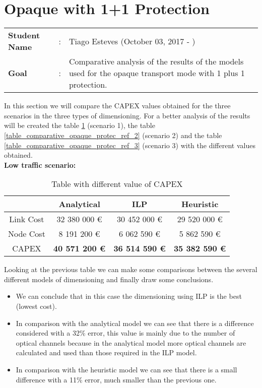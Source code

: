 \clearpage

\section{Opaque with 1+1 Protection}\label{comparative_Opaque_Protection}
\begin{tcolorbox}	
\begin{tabular}{p{2.75cm} p{0.2cm} p{10.5cm}} 	
\textbf{Student Name}  &:& Tiago Esteves    (October 03, 2017 - )\\
\textbf{Goal}          &:& Comparative analysis of the results of the models used for the opaque transport mode with 1 plus 1 protection.
\end{tabular}
\end{tcolorbox}
\vspace{11pt}


In this section we will compare the CAPEX values obtained for the three scenarios in the three types of dimensioning. For a better analysis of the results will be created the table \ref{table_comparative_opaque_protec_ref_1} (scenario 1), the table \ref{table_comparative_opaque_protec_ref_2} (scenario 2) and the table \ref{table_comparative_opaque_protec_ref_3} (scenario 3) with the different values obtained.\\

\textbf{Low traffic scenario:}

\begin{table}[h!]
\centering
\begin{tabular}{| c | c | c | c |}
 \hline
   & Analytical & ILP & Heuristic \\
 \hline\hline
 Link Cost & 32 380 000 \euro & 30 452 000 \euro & 29 520 000 \euro \\
 Node Cost & 8 191 200 \euro & 6 062 590 \euro & 5 862 590 \euro \\
 CAPEX & \textbf{40 571 200 \euro} & \textbf{36 514 590 \euro} & \textbf{35 382 590 \euro} \\
 \hline
\end{tabular}
\caption{Table with different value of CAPEX }
\label{table_comparative_opaque_protec_ref_1}
\end{table}

\vspace{11pt}
Looking at the previous table we can make some comparisons between the several different models of dimensioning and finally draw some conclusions.

\begin{itemize}
  \item We can conclude that in this case the dimensioning using ILP is the best (lowest cost).
  \item In comparison with the analytical model we can see that there is a difference considered with a 32\% error, this value is mainly due to the number of optical channels because in the analytical model more optical channels are calculated and used than those required in the ILP model.
  \item In comparison with the heuristic model we can see that there is a small difference with a 11\% error, much smaller than the previous one.
\end{itemize}

